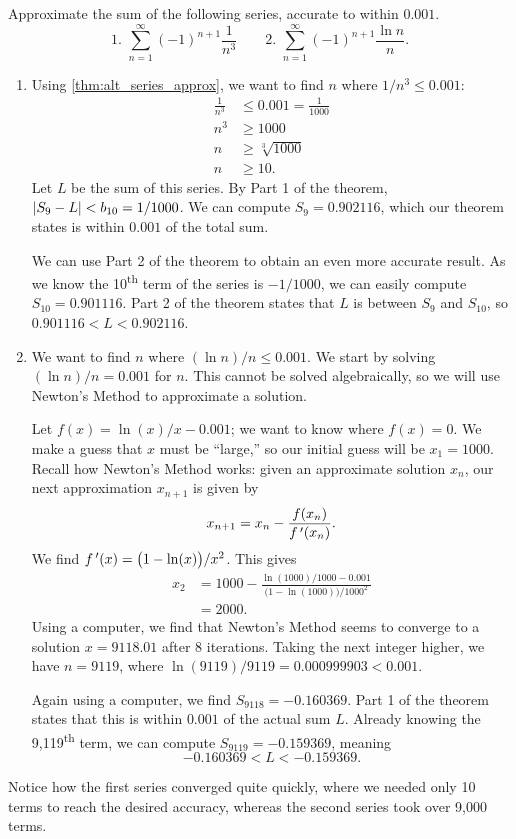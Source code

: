 \begin{example}\label{ex_alt_series_approx}%
Approximate the sum of the following series, accurate to within $0.001$.
\[
 \text{1. }\sum_{n=1}^\infty (-1)^{n+1}\frac{1}{n^3}\qquad
 \text{2. }\sum_{n=1}^\infty (-1)^{n+1}\frac{\ln n}{n}.
\]
\solution
\begin{enumerate}
	\item  Using \autoref{thm:alt_series_approx}, we want to find $n$ where $1/n^3 \le 0.001$:
	\begin{align*}
	\frac1{n^3} &\leq 0.001=\frac{1}{1000} \\
	n^3 &\geq 1000\\
	n &\geq \sqrt[3]{1000}\\
	n &\geq 10.
	\end{align*}
	Let $L$ be the sum of this series. By Part 1 of the theorem, $\left\lvert S_9-L \right\rvert<b_{10} = 1/1000$. We can compute $S_9=0.902116$, which our theorem states is within $0.001$ of the total sum. 
	
	We can use Part 2 of the theorem to obtain an even more accurate result. As we know the 10\textsuperscript{th} term of the series is $-1/1000$, we can easily compute $S_{10} = 0.901116$. Part 2 of the theorem states that $L$ is between $S_9$ and $S_{10}$, so $0.901116 <L<0.902116$.
	
	\item		We want to find $n$ where $(\ln n)/n \le 0.001$. We start by solving $(\ln n)/n = 0.001$ for $n$. This cannot be solved algebraically, so we will use Newton's Method to approximate a solution. 
	
	Let $f(x) = \ln(x)/x-0.001$; we want to know where $f(x) = 0$. We make a guess that $x$ must be ``large,'' so our initial guess will be $x_1=1000$. Recall how Newton's Method works: given an approximate solution $x_n$, our next approximation $x_{n+1}$ is given by
	\[x_{n+1} = x_n - \frac{f(x_n)}{f\,'(x_n)}.\]
	We find $f\,'(x) = \bigl(1-\ln(x)\bigr)/x^2$. This gives
	\begin{align*}
	x_2 &= 1000 - \frac{\ln(1000)/1000-0.001}{\bigl(1-\ln(1000)\bigr)/1000^2} \\
			&= 2000.
	\end{align*}
	Using a computer, we find that Newton's Method seems to converge to a solution $x=9118.01$ after 8 iterations. Taking the next integer higher, we have $n=9119$, where $\ln(9119)/9119 =0.000999903<0.001$.
	
	Again using a computer, we find $S_{9118} = -0.160369$. Part 1 of the theorem states that this is within $0.001$ of the actual sum $L$. Already knowing the 9,119\textsuperscript{th} term, we can compute $S_{9119} = -0.159369$, meaning
	\[-0.160369 < L < -0.159369.\]
	
\end{enumerate}
Notice how the first series converged quite quickly, where we needed only 10 terms to reach the desired accuracy, whereas the second series took over 9,000 terms.
\end{example}

